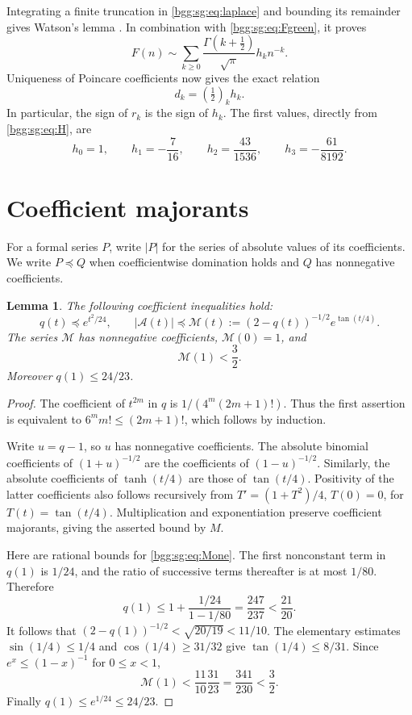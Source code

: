 \documentclass[11pt,a4paper]{article}
\numberwithin{equation}{section}
\newtheorem{lemma}[theorem]{Lemma}
\theoremstyle{definition}
\theoremstyle{remark}
\theoremstyle{definition}
\begin{document}
Integrating a finite truncation in \eqref{bgg:sg:eq:laplace} and bounding its
remainder gives Watson's lemma \cite{dlmf-watson}.  In combination
with \eqref{bgg:sg:eq:Fgreen}, it proves
\[
 F(n)\sim\sum_{k\ge0}\frac{\Gamma(k+\tfrac12)}{\sqrt\pi}h_kn^{-k}.
\]
Uniqueness of Poincare coefficients now gives the exact relation
\begin{equation}\label{bgg:sg:eq:dh}
 \boxed{d_k=(\tfrac12)_k h_k.}
\end{equation}
In particular, the sign of \(r_k\) is the sign of \(h_k\).
The first values, directly from \eqref{bgg:sg:eq:H}, are
\begin{equation}\label{bgg:sg:eq:hinitial}
 h_0=1,\qquad h_1=-\frac7{16},\qquad
 h_2=\frac{43}{1536},\qquad h_3=-\frac{61}{8192}.
\end{equation}

\section{Coefficient majorants}\label{bgg:sg:sec:majorants}

For a formal series \(P\), write \(|P|\) for the series of absolute
values of its coefficients.  We write \(P\preccurlyeq Q\) when
coefficientwise domination holds and \(Q\) has nonnegative coefficients.

\begin{lemma}\label{bgg:sg:lem:majorants}
The following coefficient inequalities hold:
\[
 q(t)\preccurlyeq e^{t^2/24},\qquad
 |\mathcal A(t)|\preccurlyeq
 \mathcal M(t):=(2-q(t))^{-1/2}e^{\tan(t/4)}.
\]
The series \(\mathcal M\) has nonnegative coefficients, \(\mathcal M(0)=1\), and
\begin{equation}\label{bgg:sg:eq:Mone}
 \mathcal M(1)<\frac32.
\end{equation}
Moreover \(q(1)\le24/23\).
\end{lemma}

\begin{proof}
The coefficient of \(t^{2m}\) in \(q\) is
\(1/(4^m(2m+1)!)\).  Thus the first assertion is equivalent to
\(6^mm!\le(2m+1)!\), which follows by induction.

Write \(u=q-1\), so \(u\) has nonnegative coefficients.  The absolute
binomial coefficients of \((1+u)^{-1/2}\) are the coefficients of
\((1-u)^{-1/2}\).  Similarly, the absolute coefficients of
\(\tanh(t/4)\) are those of \(\tan(t/4)\).  Positivity of the
latter coefficients also follows recursively from
\(T'=(1+T^2)/4\), \(T(0)=0\), for \(T(t)=\tan(t/4)\).
Multiplication and exponentiation preserve coefficient majorants,
giving the asserted bound by \(M\).

Here are rational bounds for \eqref{bgg:sg:eq:Mone}.  The first nonconstant
term in \(q(1)\) is \(1/24\), and the ratio of successive terms
thereafter is at most \(1/80\).  Therefore
\[
 q(1)\le1+\frac{1/24}{1-1/80}=\frac{247}{237}<\frac{21}{20}.
\]
It follows that \((2-q(1))^{-1/2}<\sqrt{20/19}<11/10\).
The elementary estimates
\(\sin(1/4)\le1/4\) and \(\cos(1/4)\ge31/32\) give
\(\tan(1/4)\le8/31\).  Since \(e^x\le(1-x)^{-1}\)
for \(0\le x<1\),
\[
 \mathcal M(1)<\frac{11}{10}\frac{31}{23}=\frac{341}{230}<\frac32.
\]
Finally \(q(1)\le e^{1/24}\le24/23\).
\end{proof}
\end{document}
